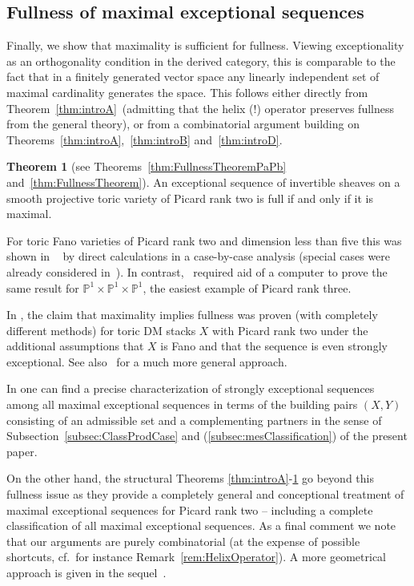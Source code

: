 \documentclass[11pt]{article}
\theoremstyle{definition}
\numberwithin{equation}{section}
\newcommand{\PP}{\mathbb P}
\newcommand{\mes}{maximal exceptional sequence}
\newcommand{\ssect}[1]{Subsection~\ref{#1}}
\newcommand{\thLex}{\ref{thm:introA}}
\newcommand{\thHeight}{\ref{thm:introB}}
\newcommand{\thClass}{\ref{thm:introD}}
\newcommand{\thFull}{\ref{thm:introE}}
\newtheorem{main}{Theorem}
\begin{document}
\subsection{Fullness of maximal exceptional sequences}
\label{subsubsec:FullnessExSeq}
{Finally, we show that maximality is 
sufficient for fullness. Viewing exceptionality 
as an orthogonality condition in the derived 
category, this is comparable to the fact that 
in a finitely generated vector space any linearly 
independent set of maximal cardinality generates 
the space. This follows either directly from Theorem~\thLex\ 
(admitting that the helix (!) operator preserves fullness 
from the general theory), or from a combinatorial argument 
building on Theorems~{\thLex},~{\thHeight} and~{\thClass}.} 

 \begin{main} [{see Theorems~\ref{thm:FullnessTheoremPaPb} and~\ref{thm:FullnessTheorem}}] \label{thm:introE}
An exceptional sequence of invertible sheaves 
on a smooth projective toric variety of Picard rank 
two is full if and only if it is maximal.
 \end{main}

For toric Fano varieties of Picard rank two and 
dimension less than five this was shown in
~\cite{pic2Fano} by direct calculations in a 
case-by-case analysis {(special cases were 
already considered in~\cite{LiuYangYu})}. 
{In contrast},~\cite{p1p1p1} required aid of a computer to 
prove the same result for $\PP^1\times\PP^1\times\PP^1$, 
the easiest example of Picard rank three.
{
In \cite{BorisovWang}, the claim that maximality implies fullness
was proven (with completely different methods) 
for toric DM stacks $X$ with Picard rank two under the additional
assumptions that $X$ is Fano and that the sequence is even 
strongly exceptional. See also~\cite{DHLKK} for a much more general approach.

In \cite[Theorem 5.3]{exsec} one can find a precise characterization 
of strongly exceptional sequences among all \mes s
in terms of the building pairs $(X,Y)$ consisting of an admissible set and a
complementing partners in the sense of
\ssect{subsec:ClassProdCase} and (\ref{subsec:mesClassification}) 
of the present paper.
}

{On the other hand, the structural Theorems {\thLex}-{\thFull} 
go beyond this fullness issue as they provide a completely general 
and conceptional treatment of \mes s for Picard rank two
-- including a complete classification of all \mes s}. As a final 
comment we note that our arguments are purely
combinatorial (at the expense of possible shortcuts, cf.\ 
for instance Remark~\ref{rem:HelixOperator}). 
A more geometrical approach is given 
in the sequel~\cite{exsec}.
\end{document}
